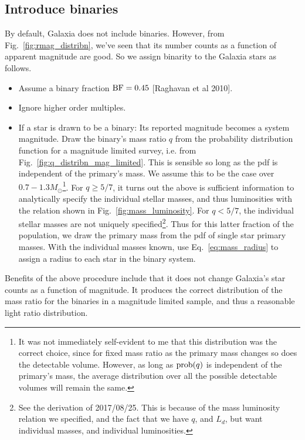 \documentclass{emulateapj}
\begin{document}
\subsection{Introduce binaries}
\label{subsec:introduce_binaries}

By default, Galaxia does not include binaries.
However, from Fig.~\ref{fig:rmag_distribn}, we've seen that its number counts 
as a function of apparent magnitude are good.
So we assign binarity to the Galaxia stars as follows.
\begin{itemize}
	\item Assume a binary fraction ${\rm BF} = 0.45$ [Raghavan et al 2010].
	\item Ignore higher order multiples.
	\item If a star is drawn to be a binary:
	\subitem Its reported magnitude becomes a system magnitude.
	\subitem Draw the binary's mass ratio $q$ from the probability distribution 
	function for a magnitude limited survey, i.e. from 
	Fig.~\ref{fig:q_distribn_mag_limited}. This is sensible so long as the pdf 
	is independent of the primary's mass. We assume this to be the case over 
	$0.7-1.3M_\odot$\footnote{It was not immediately self-evident to me that 
	this distribution was the correct choice, since for fixed mass ratio as the 
	primary mass changes so does the detectable volume. However, as long as 
	${\rm prob}(q)$ is independent of the primary's mass, the average 
	distribution over all the possible detectable volumes will remain the 
	same.}.
	\subitem For $q \geq 5/7$, it turns out the above is sufficient information 
	to analytically specify the individual stellar masses, and thus 
	luminosities with the relation shown in Fig.~\ref{fig:mass_luminosity}.
	\subitem For $q < 5/7$, the individual stellar masses are not uniquely 
	specified\footnote{See the derivation of 2017/08/25. This is because of the 
	mass luminosity relation we specified, and the fact that we have $q$, and 
	$L_d$, but want individual masses, and individual luminosities.}. Thus for 
	this latter fraction of the population, we draw the 
	primary mass from the pdf of single star primary masses.
	\subitem With the individual masses known, use Eq.~\ref{eq:mass_radius} to 
	assign a radius to each star in the binary system.
\end{itemize}

Benefits of the above procedure include that it does not change Galaxia's 
star counts as a function of magnitude.
It produces the correct distribution of the mass ratio for the binaries in a 
magnitude limited sample, and thus a reasonable light ratio distribution. 
\end{document}
